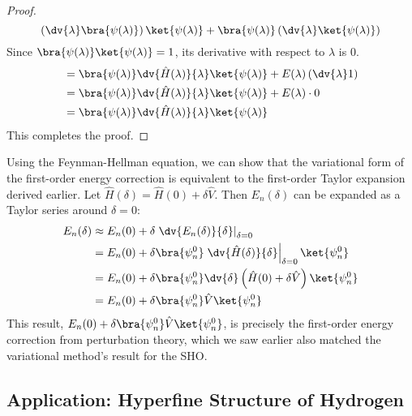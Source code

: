 \begin{proof}
\begin{equation}
    \left(\dv{\lambda} \bra{\psi(\lambda)}\right)
    \ket{\psi(\lambda)} + \bra{\psi(\lambda)} \left(\dv{\lambda}
    \ket{\psi(\lambda)}\right)
  \end{equation}
  Since $\bra{\psi(\lambda)}\ket{\psi(\lambda)} = 1$, its
  derivative with respect to $\lambda$ is $0$.
  \begin{align} \label{eq:feynman_hellman_derivation_final}
    &= \bra{\psi(\lambda)} \dv{\hat H(\lambda)}{\lambda}
    \ket{\psi(\lambda)} + E(\lambda) \left(\dv{\lambda} 1\right) \\
    &= \bra{\psi(\lambda)} \dv{\hat H(\lambda)}{\lambda}
    \ket{\psi(\lambda)} + E(\lambda) \cdot 0 \notag \\
    &= \bra{\psi(\lambda)} \dv{\hat H(\lambda)}{\lambda}
    \ket{\psi(\lambda)} \notag
  \end{align}
  This completes the proof.
\end{proof}

\begin{example}
  Using the Feynman-Hellman equation, we can show that the
  variational form of the first-order energy correction is
  equivalent to the first-order Taylor expansion derived earlier.
  Let $\hat H(\delta) = \hat H(0) + \delta\hat V$. Then
  $E_n(\delta)$ can be expanded as a Taylor series around $\delta=0$:
  \begin{align} \label{eq:taylor_expansion_feynman_hellman}
    E_n(\delta) &\approx E_n(0) + \delta
    \left.\dv{E_n(\delta)}{\delta} \right|_{\delta =0} \\
    &= E_n(0) + \delta \bra{\psi_n^0} \left.\dv{\hat
    H(\delta)}{\delta}\right|_{\delta=0} \ket{\psi_n^0} \notag \\
    &= E_n(0) + \delta \bra{\psi_n^0} \dv{\delta}\left(\hat H(0)
    + \delta\hat V\right) \ket{\psi_n^0} \notag \\
    &= E_n(0) + \delta \bra{\psi_n^0} \hat V\ket{\psi_n^0} \notag
  \end{align}
  This result, $E_n(0) + \delta \bra{\psi_n^0} \hat
  V\ket{\psi_n^0}$, is precisely the first-order energy correction
  from perturbation theory, which we saw earlier also matched the
  variational method's result for the SHO.
\end{example}

\hr
\subsection{Application: Hyperfine Structure of Hydrogen}

